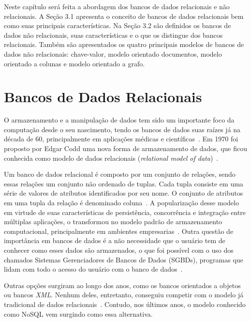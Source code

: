 Neste capítulo será feita a abordagem dos bancos de dados relacionais e não relacionais. A Seção 3.1 apresenta o conceito de bancos de dados relacionais bem como suas principais características. Na Seção 3.2 são definidos os bancos de dados não relacionais, suas características e o que os distingue dos bancos relacionais. Também são apresentados os quatro principais modelos de bancos de dados não relacionais: chave-valor, modelo orientado documentos, modelo orientado a colunas e modelo orientado a grafo.

\section{Bancos de Dados Relacionais}
O armazenamento e a manipulação de dados tem sido um importante foco da computação desde o seu nascimento, tendo os bancos de dados suas raízes já na década de 60, principalmente em aplicações médicas e científicas~\cite{neufeld1986database}. Em 1970 foi proposto por Edgar Codd uma nova forma de armazenamento de dados, que ficou conhecida como modelo de dados relacionais (\emph{relational model of data})~\cite{codd1970relational}. 

Um banco de dados relacional é composto por um conjunto de relações, sendo essas relações um conjunto não ordenado de tuplas. Cada tupla consiste em uma série de valores de atributos identificados por seu nome. O conjunto de atributos em uma tupla da relação é denominado coluna~\cite{heuser}. A popularização desse modelo em virtude de suas características de persistência, concorrência e integração entre múltiplas aplicações, o transformou no modelo padrão de armazenamento computacional, principalmente em ambientes empresarias~\cite{pramod}. Outra questão de importância em bancos de dados é a não necessidade que o usuário tem de conhecer como esses dados são armazenados, o que foi possível com o uso dos chamados Sistemas Gerenciadores de Bancos de Dados (SGBDs), programas que lidam com todo o acesso do usuário com o banco de dados~\cite{jan, cjdate}.

Outras opções surgiram ao longo dos anos, como os bancos orientados a objetos ou bancos \emph{XML}. Nenhum deles, entretanto, conseguiu competir com o modelo já tradicional de dados relacionais~\cite{pramod}. Contudo, nos últimos anos, o modelo conhecido como NoSQL vem surgindo como essa alternativa.


